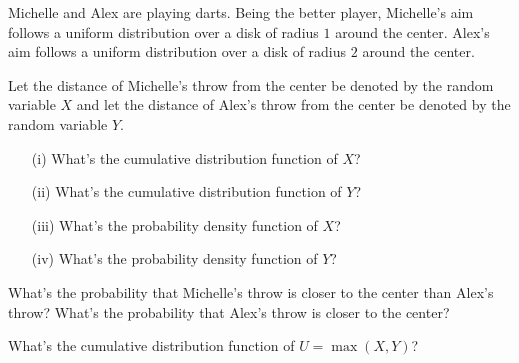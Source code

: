\documentclass[11pt]{article}
\begin{document}

Michelle and Alex are playing darts.
Being the better player, Michelle's aim follows a uniform distribution over a 
disk of radius $1$ around the center. Alex's aim follows a uniform distribution 
over a disk of radius $2$ around the center. 

\begin{Parts}
    \Part Let the distance of Michelle's throw from the center be denoted by the 
    random variable $X$ and let the distance of Alex's throw from the center be 
    denoted by the random variable $Y$.
    \begin{enumerate}
    \item[(i)] What's the cumulative distribution function of $X$?
    \item[(ii)] What's the cumulative distribution function of $Y$?
    \item[(iii)] What's the probability density function of $X$?
    \item[(iv)] What's the probability density function of $Y$?
    \end{enumerate}
    
    \Part What's the probability that Michelle's throw is closer to the center 
    than Alex's throw? What's the probability that Alex's throw is closer to 
    the center? 
    
    \Part What's the cumulative distribution function of $U = \max(X,Y)$?
        
\end{Parts}
\end{document}
